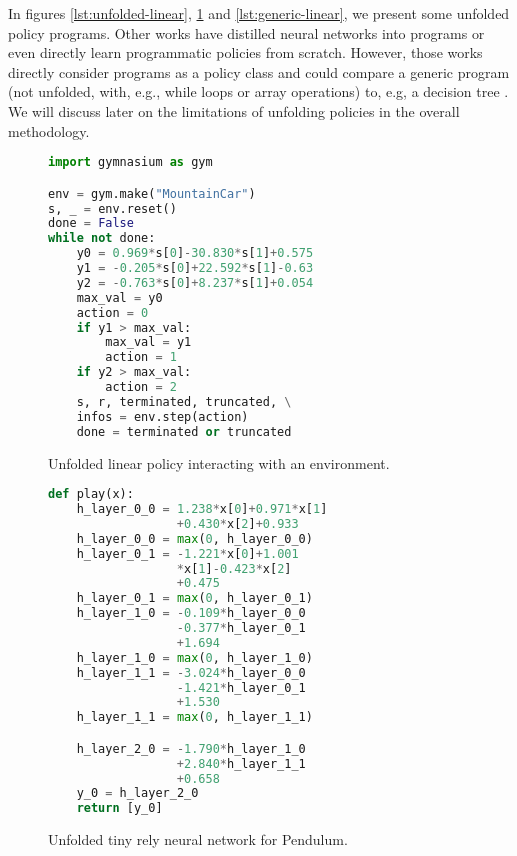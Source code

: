 In figures \ref{lst:unfolded-linear}, \ref{lst:tiny-relu} and \ref{lst:generic-linear}, we present some unfolded policy programs.
Other works have distilled neural networks into programs \cite{PIRL} or even directly learn programmatic policies \cite{pirl2} from scratch.
However, those works directly consider programs as a policy class and could compare a generic program (not unfolded, with, e.g., while loops or array operations) to, e.g, a decision tree \cite{leap}.
We will discuss later on the limitations of unfolding policies in the overall methodology.

\begin{figure}
\centering
\begin{minipage}{0.47\textwidth}
\begin{lstlisting}[language=Python,style=mystyle]
import gymnasium as gym

env = gym.make("MountainCar")
s, _ = env.reset()
done = False
while not done:
    y0 = 0.969*s[0]-30.830*s[1]+0.575
    y1 = -0.205*s[0]+22.592*s[1]-0.63
    y2 = -0.763*s[0]+8.237*s[1]+0.054
    max_val = y0
    action = 0
    if y1 > max_val:
        max_val = y1
        action = 1
    if y2 > max_val:
        action = 2
    s, r, terminated, truncated, \
    infos = env.step(action)
    done = terminated or truncated
\end{lstlisting}
\caption{Unfolded linear policy interacting with an environment.}\label{lst:unfolded-linear}
\end{minipage}
\hfill
\begin{minipage}{0.47\textwidth}
\begin{lstlisting}[language=Python,style=mystyle]
def play(x):
    h_layer_0_0 = 1.238*x[0]+0.971*x[1]
                  +0.430*x[2]+0.933
    h_layer_0_0 = max(0, h_layer_0_0)
    h_layer_0_1 = -1.221*x[0]+1.001
                  *x[1]-0.423*x[2]
                  +0.475
    h_layer_0_1 = max(0, h_layer_0_1)
    h_layer_1_0 = -0.109*h_layer_0_0
                  -0.377*h_layer_0_1
                  +1.694
    h_layer_1_0 = max(0, h_layer_1_0)
    h_layer_1_1 = -3.024*h_layer_0_0
                  -1.421*h_layer_0_1
                  +1.530
    h_layer_1_1 = max(0, h_layer_1_1)

    h_layer_2_0 = -1.790*h_layer_1_0
                  +2.840*h_layer_1_1
                  +0.658
    y_0 = h_layer_2_0
    return [y_0]
\end{lstlisting}
\caption{Unfolded tiny rely neural network for Pendulum.}\label{lst:tiny-relu}
\end{minipage}
\end{figure}